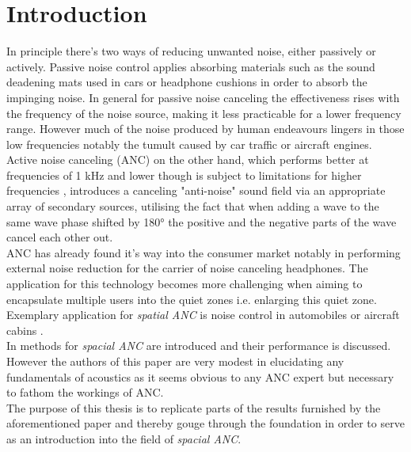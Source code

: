 \chapter{Introduction}
\label{chap:introduction}

In principle there's two ways of reducing unwanted noise, either passively or actively. Passive noise control applies absorbing materials such as the sound deadening mats used in cars or headphone cushions in order to absorb the impinging noise. In general for passive noise canceling the effectiveness rises with the frequency of the noise source, making it less practicable for a lower frequency range.\cite{Chen2017} However much of the noise produced by human endeavours lingers in those low frequencies notably the tumult caused by car traffic or aircraft engines. Active noise canceling (ANC) on the other hand, which performs better at frequencies of 1 kHz and lower though is subject to limitations for higher frequencies \cite{Kaymak2006}, introduces a canceling "anti-noise" sound field via an appropriate array of secondary sources\cite{Kuo1999}, utilising the fact that when adding a wave to the same wave phase shifted by 180° the positive and the negative parts of the wave cancel each other out.\\

ANC has already found it's way into the consumer market notably in performing external noise reduction for the carrier of noise canceling headphones. The application for this technology becomes more challenging when aiming to encapsulate multiple users into the quiet zones i.e. enlarging this quiet zone. Exemplary application for \textit{spatial ANC} is noise control in automobiles or aircraft cabins \cite{Zhang2019}.\\

In \cite{Zhang2019} methods for \textit{spacial ANC} are introduced and their performance is discussed. However the authors of this paper are very modest in elucidating any fundamentals of acoustics as it seems obvious to any ANC expert but necessary to fathom the workings of ANC.\\ 
The purpose of this thesis is to replicate parts of the results furnished by the aforementioned paper and thereby gouge through the foundation in order to serve as an introduction into the field of \textit{spacial ANC}.\\

